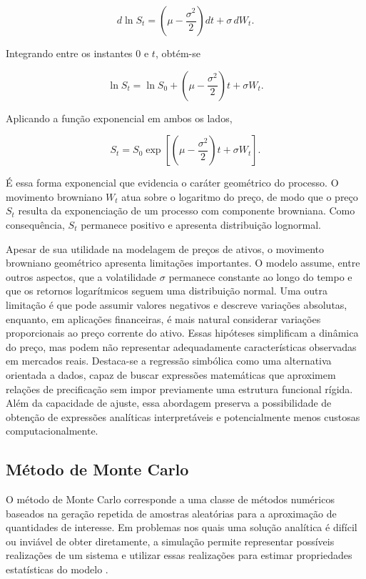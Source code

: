 \begin{equation}
d\ln S_t
=
\left(
\mu-\frac{\sigma^2}{2}
\right)dt
+
\sigma\,dW_t.
\end{equation}

Integrando entre os instantes $0$ e $t$, obtém-se

\begin{equation}
\ln S_t
=
\ln S_0
+
\left(
\mu-\frac{\sigma^2}{2}
\right)t
+
\sigma W_t.
\end{equation}

Aplicando a função exponencial em ambos os lados,

\begin{equation}
S_t
=
S_0
\exp\left[
\left(
\mu-\frac{\sigma^2}{2}
\right)t
+
\sigma W_t
\right].
\end{equation}

É essa forma exponencial que evidencia o caráter geométrico do processo.
O movimento browniano $W_t$ atua sobre o logaritmo do preço, de modo que o
preço $S_t$ resulta da exponenciação de um processo com componente
browniana. Como consequência, $S_t$ permanece positivo e apresenta
distribuição lognormal.

Apesar de sua utilidade na modelagem de preços de ativos, o movimento
browniano geométrico apresenta limitações importantes. O modelo assume,
entre outros aspectos, que a volatilidade $\sigma$ permanece constante ao
longo do tempo e que os retornos logarítmicos seguem uma distribuição
normal. Uma outra limitação é que pode assumir valores negativos e descreve variações absolutas, enquanto, em aplicações
financeiras, é mais natural considerar variações proporcionais ao preço
corrente do ativo. Essas hipóteses simplificam a dinâmica do preço, mas podem não
representar adequadamente características observadas em mercados reais.
Destaca-se a regressão simbólica como uma alternativa orientada
a dados, capaz de buscar expressões matemáticas que aproximem relações de
precificação sem impor previamente uma estrutura funcional rígida. Além da
capacidade de ajuste, essa abordagem preserva a possibilidade de obtenção de
expressões analíticas interpretáveis e potencialmente menos custosas
computacionalmente.

\subsection{Método de Monte Carlo}

O método de Monte Carlo corresponde a uma classe de métodos numéricos
baseados na geração repetida de amostras aleatórias para a aproximação de
quantidades de interesse. Em problemas nos quais uma solução analítica é
difícil ou inviável de obter diretamente, a simulação permite representar
possíveis realizações de um sistema e utilizar essas realizações para
estimar propriedades estatísticas do modelo \cite{glasserman2003}.

